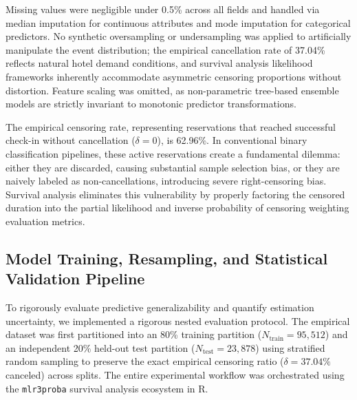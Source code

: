 \documentclass[pdflatex,iicol,sn-mathphys-ay]{sn-jnl}
\theoremstyle{thmstyleone}%
\theoremstyle{thmstyletwo}%
\theoremstyle{thmstylethree}%
\begin{document}
Missing values were negligible under 0.5\% across all fields and handled via median imputation for continuous attributes and mode imputation for categorical predictors. No synthetic oversampling or undersampling was applied to artificially manipulate the event distribution; the empirical cancellation rate of 37.04\% reflects natural hotel demand conditions, and survival analysis likelihood frameworks inherently accommodate asymmetric censoring proportions without distortion. Feature scaling was omitted, as non-parametric tree-based ensemble models are strictly invariant to monotonic predictor transformations.

The empirical censoring rate, representing reservations that reached successful check-in without cancellation ($\delta = 0$), is 62.96\%. In conventional binary classification pipelines, these active reservations create a fundamental dilemma: either they are discarded, causing substantial sample selection bias, or they are naively labeled as non-cancellations, introducing severe right-censoring bias. Survival analysis eliminates this vulnerability by properly factoring the censored duration into the partial likelihood and inverse probability of censoring weighting evaluation metrics.

\subsection{Model Training, Resampling, and Statistical Validation Pipeline}
\label{sec:experiments}

To rigorously evaluate predictive generalizability and quantify estimation uncertainty, we implemented a rigorous nested evaluation protocol. The empirical dataset was first partitioned into an 80\% training partition ($N_{\text{train}} = 95{,}512$) and an independent 20\% held-out test partition ($N_{\text{test}} = 23{,}878$) using stratified random sampling to preserve the exact empirical censoring ratio ($\delta = 37.04\%$ canceled) across splits. The entire experimental workflow was orchestrated using the \texttt{mlr3proba} survival analysis ecosystem in R.
\end{document}
